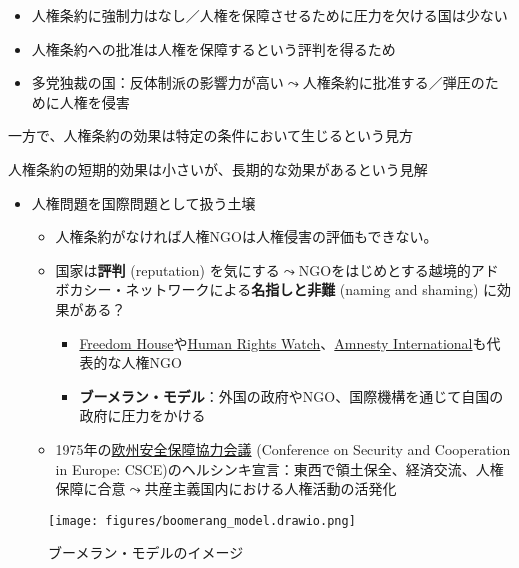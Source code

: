 \documentclass[
  xelatex,
  ja=standard]{bxjsarticle}
\providecommand{\tightlist}{%
  \setlength{\itemsep}{0pt}\setlength{\parskip}{0pt}}\usepackage{longtable,booktabs,array}
\begin{document}
\begin{itemize}
\tightlist
\item
  人権条約に強制力はなし／人権を保障させるために圧力を欠ける国は少ない
\item
  人権条約への批准は人権を保障するという評判を得るため
\item
  多党独裁の国：反体制派の影響力が高い\(\leadsto\)人権条約に批准する／弾圧のために人権を侵害
\end{itemize}

一方で、人権条約の効果は特定の条件において生じるという見方\citep{neumayer2005, murdie2012, conrad2013, lupu2013}

人権条約の短期的効果は小さいが、長期的な効果があるという見解\citep{hafner2007, tsutsui2012}

\begin{itemize}
\tightlist
\item
  人権問題を国際問題として扱う土壌

  \begin{itemize}
  \tightlist
  \item
    人権条約がなければ人権NGOは人権侵害の評価もできない。
  \item
    国家は\textbf{評判} (reputation)
    を気にする\(\leadsto\)NGOをはじめとする越境的アドボカシー・ネットワークによる\textbf{名指しと非難}
    (naming and shaming) に効果がある？\citep{hafner2008}

    \begin{itemize}
    \tightlist
    \item
      \href{https://freedomhouse.org/}{Freedom
      House}や\href{https://www.hrw.org/ja}{Human Rights
      Watch}、\href{https://www.amnesty.or.jp/}{Amnesty
      International}も代表的な人権NGO
    \item
      \textbf{ブーメラン・モデル}：外国の政府やNGO、国際機構を通じて自国の政府に圧力をかける\citep{keck1999}
    \end{itemize}
  \item
    1975年の\href{https://www.mofa.go.jp/mofaj/area/osce/gaiyo.html}{欧州安全保障協力会議}
    (Conference on Security and Cooperation in Europe:
    CSCE)のヘルシンキ宣言：東西で領土保全、経済交流、人権保障に合意\(\leadsto\)共産主義国内における人権活動の活発化
  \end{itemize}
\end{itemize}

\begin{figure}[htpb]

{\centering \texttt{[image: figures/boomerang\_model.drawio.png]}

}

\caption{ブーメラン・モデルのイメージ}

\end{figure}
\end{document}
